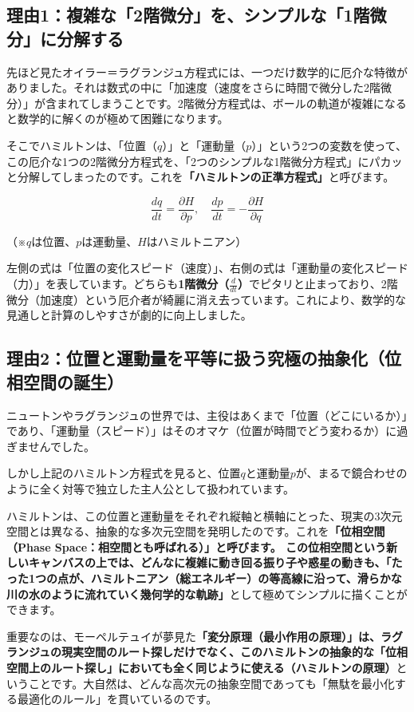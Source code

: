 \subsection{理由1：複雑な「2階微分」を、シンプルな「1階微分」に分解する}

先ほど見たオイラー＝ラグランジュ方程式には、一つだけ数学的に厄介な特徴がありました。それは数式の中に「加速度（速度をさらに時間で微分した2階微分）」が含まれてしまうことです。2階微分方程式は、ボールの軌道が複雑になると数学的に解くのが極めて困難になります。

そこでハミルトンは、「位置（\(q\)）」と「運動量（\(p\)）」という2つの変数を使って、この厄介な1つの2階微分方程式を、「2つのシンプルな1階微分方程式」にパカッと分解してしまったのです。これを\textbf{「ハミルトンの正準方程式」}と呼びます。

\[
\frac{dq}{dt}=\frac{\partial H}{\partial p},\quad \frac{dp}{dt}=-\frac{\partial H}{\partial q}
\]

（※\(q\)は位置、\(p\)は運動量、\(H\)はハミルトニアン）

左側の式は「位置の変化スピード（速度）」、右側の式は「運動量の変化スピード（力）」を表しています。どちらも\textbf{1階微分（\(\frac{d}{dt}\)）}でピタリと止まっており、2階微分（加速度）という厄介者が綺麗に消え去っています。これにより、数学的な見通しと計算のしやすさが劇的に向上しました。

\subsection{理由2：位置と運動量を平等に扱う究極の抽象化（位相空間の誕生）}

ニュートンやラグランジュの世界では、主役はあくまで「位置（どこにいるか）」であり、「運動量（スピード）」はそのオマケ（位置が時間でどう変わるか）に過ぎませんでした。

しかし上記のハミルトン方程式を見ると、位置\(q\)と運動量\(p\)が、まるで鏡合わせのように全く対等で独立した主人公として扱われています。

ハミルトンは、この位置と運動量をそれぞれ縦軸と横軸にとった、現実の3次元空間とは異なる、抽象的な多次元空間を発明したのです。これを\textbf{「位相空間（Phase Space：相空間とも呼ばれる）」と呼びます。 この位相空間という新しいキャンバスの上では、どんなに複雑に動き回る振り子や惑星の動きも、「たった1つの点が、ハミルトニアン（総エネルギー）の等高線に沿って、滑らかな川の水のように流れていく幾何学的な軌跡」}として極めてシンプルに描くことができます。

重要なのは、モーペルテュイが夢見た\textbf{「変分原理（最小作用の原理）」は、ラグランジュの現実空間のルート探しだけでなく、このハミルトンの抽象的な「位相空間上のルート探し」においても全く同じように使える（ハミルトンの原理）}ということです。大自然は、どんな高次元の抽象空間であっても「無駄を最小化する最適化のルール」を貫いているのです。


